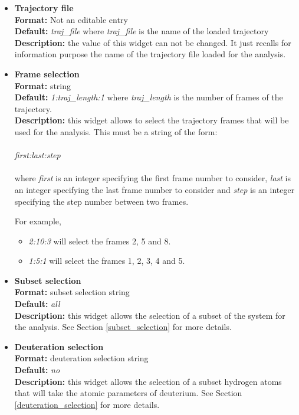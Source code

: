 \documentclass[a4paper,11pt]{report}
\begin{document}
\begin{itemize}
\item \textbf{Trajectory file}\\
\textbf{Format:} Not an editable entry\\
\textbf{Default:} \textit{traj\_file} where \textit{traj\_file} is the name of the loaded trajectory\\
\textbf{Description:} the value of this widget can not be changed. It just recalls for information purpose the name
of the trajectory file loaded for the analysis.

\item \textbf{Frame selection}\\
\textbf{Format:} string\\
\textbf{Default:} \textit{1:traj\_length:1} where \textit{traj\_length} is the number of frames of the trajectory.\\
\textbf{Description:} this widget allows to select the trajectory frames that will be used for the analysis. This must
be a string of the form:
\\\\
\textit{first:last:step}
\\\\
where \textit{first} is an integer specifying the first frame number to consider, \textit{last} is an integer specifying the last 
frame number to consider and \textit{step} is an integer specifying the step number between two frames.

For example,
\begin{itemize}
\item \textit{2:10:3} will select the frames 2, 5 and 8.
\item \textit{1:5:1} will select the frames 1, 2, 3, 4 and 5.
\end{itemize}

\item \textbf{Subset selection}\\
\textbf{Format:} subset selection string\\
\textbf{Default:} \textit{all}\\
\textbf{Description:} this widget allows the selection of a subset of the system for the analysis. 
See Section \ref{subset_selection} for more details.

\item \textbf{Deuteration selection}\\
\textbf{Format:} deuteration selection string\\
\textbf{Default:} \textit{no}\\
\textbf{Description:} this widget allows the selection of a subset hydrogen atoms that will take the atomic parameters 
of deuterium. See Section \ref{deuteration_selection} for more details.


\end{itemize}
\end{document}

